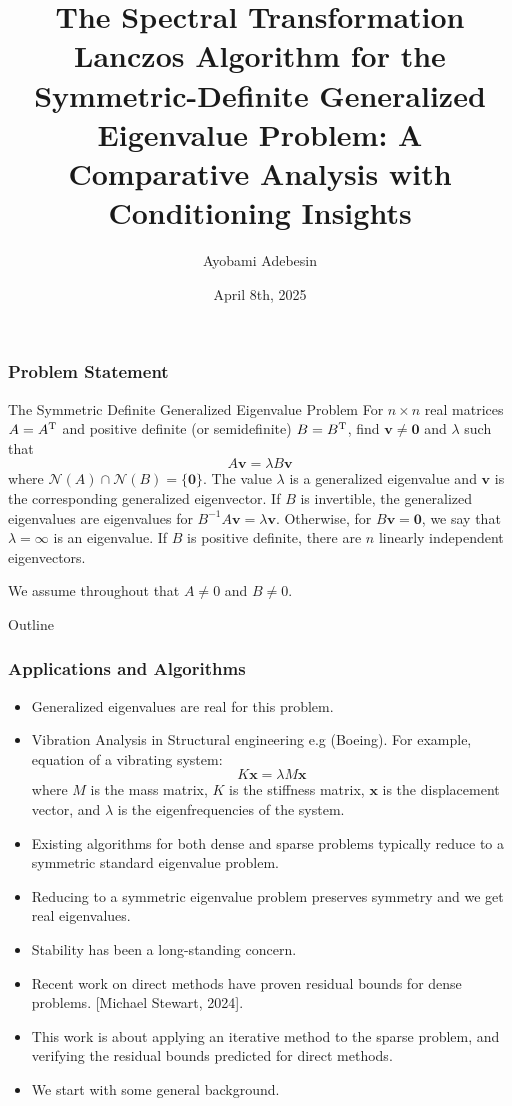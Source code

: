 \documentclass[landscape]{beamer}
\title[Spectral Transformation Lanczos Algorithm]{The Spectral Transformation Lanczos Algorithm for the Symmetric-Definite Generalized
	Eigenvalue Problem: A Comparative Analysis with Conditioning Insights}
\author{Ayobami Adebesin} \institute{Department of Mathematics and Statistics\\Georgia State University} \date{April 8th, 2025}
\renewcommand{\vec}[1]{\bm{#1}}
\newcommand{\T}{{\rm T}}
\newcommand{\mcal}[1]{\mathcal{#1}}
\begin{document}
\begin{frame}
  \titlepage

\end{frame}

\begin{frame}
  \frametitle{Problem Statement}

  \begin{block}{The Symmetric Definite Generalized Eigenvalue Problem}
    For $n\times n$ real matrices $A=A^\T$ and positive definite (or
    semidefinite) $B=B^\T$, find $\vec{v}\neq \vec{0}$ and $\lambda$
    such that
    \begin{equation*}
      A\vec{v} = \lambda B\vec{v}
    \end{equation*}
    where $\mcal{N}(A)\cap \mcal{N}(B)=\{\vec{0}\}$.  The value
    $\lambda$ is a generalized eigenvalue and $\vec{v}$ is the
    corresponding generalized eigenvector.  If $B$ is invertible, the
    generalized eigenvalues are eigenvalues for
    $B^{-1}A\vec{v} = \lambda \vec{v}$.  Otherwise, for
    $B\vec{v}=\vec{0}$, we say that $\lambda = \infty$ is an
    eigenvalue.  If $B$ is positive definite, there are $n$ linearly
    independent eigenvectors.
  \end{block}
  
  We assume throughout that $A\neq 0$ and $B\neq 0$.
\end{frame}

\begin{frame}[allowframebreaks]{Outline}
  \frametitle{Applications and Algorithms}

  \begin{itemize}
  \item Generalized eigenvalues are real for this problem.
  \item Vibration Analysis in Structural engineering e.g (Boeing).  For
    example, equation of a vibrating system:
    \begin{equation*}
      K\mathbf{x} = \lambda M\mathbf{x}
    \end{equation*}
    where $M$ is the mass matrix, $K$ is the stiffness matrix, $\mathbf{x}$ is
    the displacement vector, and $\lambda$ is the eigenfrequencies of the
    system.
  \item Existing algorithms for both dense and sparse problems typically
      reduce to a symmetric standard eigenvalue problem.
  \item Reducing to a symmetric eigenvalue problem preserves symmetry
      and we get real eigenvalues.
  \item Stability has been a long-standing concern.
  \item Recent work on direct methods have proven residual bounds for dense
    problems. [Michael Stewart, 2024].
  \item This work is about applying an iterative method to the sparse problem,
    and verifying the residual bounds predicted for direct methods.
  \item We start with some general background.
  \end{itemize}
\end{frame}
\end{document}
